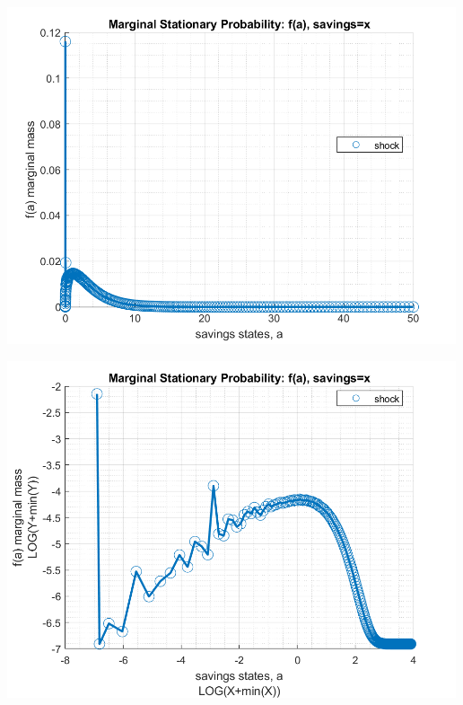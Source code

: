 \documentclass[
]{book}
\begin{document}
\includegraphics[width=5.20833in,height=\textheight]{img/fx_ds_az_cts_vec_images/figure_0.png}

\includegraphics[width=5.20833in,height=\textheight]{img/fx_ds_az_cts_vec_images/figure_1.png}
\end{document}
